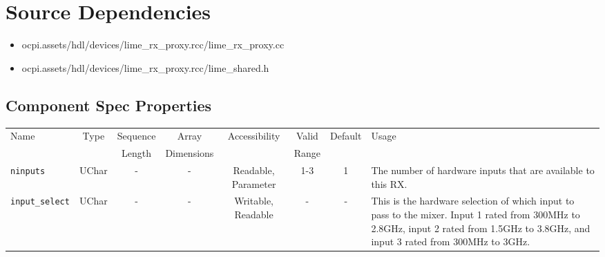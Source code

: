 \documentclass{article}
\begin{document}
\section*{Source Dependencies}
\begin{itemize}
	\item ocpi.assets/hdl/devices/lime\_rx\_proxy.rcc/lime\_rx\_proxy.cc
	\item ocpi.assets/hdl/devices/lime\_rx\_proxy.rcc/lime\_shared.h
\end{itemize}

\begin{landscape}
	\section*{Component Spec Properties}
	\begin{scriptsize}
		\begin{tabular}{|p{3cm}|c|c|c|c|c|c|p{10cm}|}
			\hline
			\rowcolor{blue}
			Name                          & Type   & Sequence & Array      & Accessibility       & Valid & Default & Usage                                                                                                                                                                                                                                                              \\
			\rowcolor{blue}
			                              &        & Length   & Dimensions &                     & Range &         &                                                                                                                                                                                                                                                                    \\
			\hline
			\verb+ninputs+                & UChar  & -        & -          & Readable, Parameter & 1-3   & 1       & The number of hardware inputs that are available to this RX.                                                                                                                                                                                                       \\
			\hline
			\verb+input_select+           & UChar  & -        & -          & Writable, Readable  & -     & -       & This is the hardware selection of which input to pass to the mixer. Input 1 rated from 300MHz to 2.8GHz, input 2 rated from 1.5GHz to 3.8GHz, and input 3 rated from 300MHz to 3GHz.                                                                               \\

\end{tabular}
\end{scriptsize}
\end{landscape}
\end{document}
